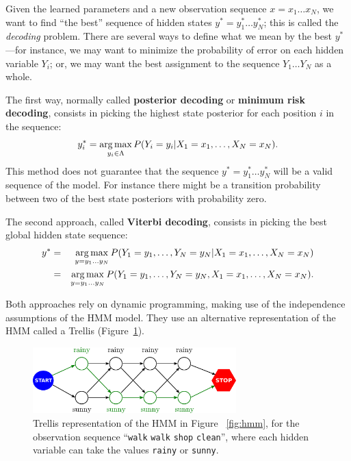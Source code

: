 Given the learned parameters and a new
observation sequence $x = x_1\ldots x_N$, we want to find ``the best'' sequence of hidden states 
$y^* = y_1^* \ldots y_N^*$;
 this is called the \emph{decoding} problem. There are several ways to define what we mean by the best
$y^*$---for instance, we may want to minimize the probability of error
on each hidden
variable $Y_i$; or, we may want the best assignment
to the sequence $Y_1\ldots Y_N$ as a whole.

The first way, normally called \textbf{posterior decoding} or \textbf{minimum risk decoding}, consists
in picking the highest state posterior for each position $i$ in the sequence:
\begin{equation}
y_i^* = \operatorname*{arg\,max}_{y_i \in \Lambda} P(Y_i=y_i | X_1=x_1,\ldots,X_N =x_N).
\end{equation}
This method does not guarantee that the sequence $y^*=y_1^* \ldots y_N^*$ will be a
valid sequence of the model. For instance there might be a transition
probability between two of the best state posteriors with probability
zero. 

The second approach, called \textbf{Viterbi decoding}, consists in
picking the best global hidden state sequence: 
\begin{eqnarray}
y^* &=& \operatorname*{arg\,max}_{y = y_1\ldots y_N} P(Y_1=y_1,\ldots, Y_N=y_N | X_1=x_1,\ldots,X_N =x_N)\nonumber\\
&=& \operatorname*{arg\,max}_{y = y_1\ldots y_N} P(Y_1=y_1,\ldots, Y_N=y_N, X_1=x_1,\ldots,X_N =x_N).
\end{eqnarray}

Both approaches rely on dynamic programming, making use of the
independence assumptions of the HMM model. They use an alternative
representation of the HMM called a Trellis (Figure~\ref{fig:trellis}). 

\begin{figure}
\centering
\includegraphics[width=0.7\textwidth]{figs/sequences/trellis_new}
\caption[HMM Trellis representation.]{\label{fig:trellis} Trellis
  representation of the HMM in Figure ~\ref{fig:hmm}, for the observation
  sequence ``{\tt walk} {\tt walk} {\tt shop} {\tt clean}'', where each hidden variable can take the values {\tt rainy} or {\tt sunny}.}
\end{figure}

